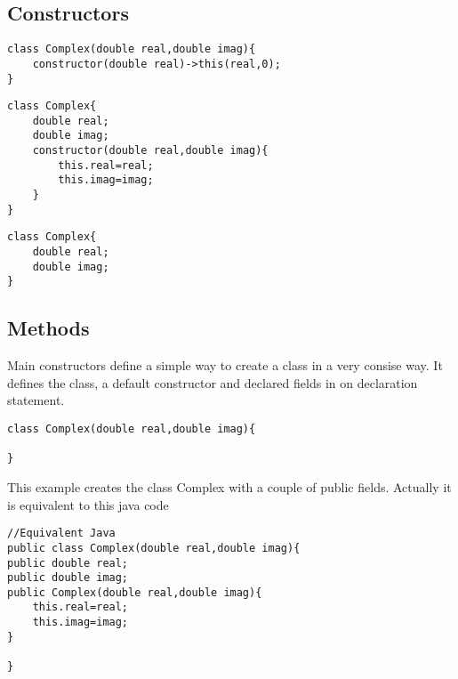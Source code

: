 \documentclass{tufte-book}
\begin{document}
            \subsection{Constructors}

            \begin{lstlisting}
class Complex(double real,double imag){
    constructor(double real)->this(real,0);
}
            \end{lstlisting}

            \begin{lstlisting}
class Complex{
    double real;
    double imag;
    constructor(double real,double imag){
        this.real=real;
        this.imag=imag;
    }
}    
            \end{lstlisting}

            \begin{lstlisting}
class Complex{
    double real;
    double imag;
}
            \end{lstlisting}





            \subsection{Methods}


            Main constructors define a simple way to create a class in a very consise way. It defines the class, a default  constructor and  declared fields in on declaration statement.
            \begin{lstlisting}
class Complex(double real,double imag){

}
            \end{lstlisting}

            This example creates the class Complex with a couple of public fields. Actually it is equivalent to this java code

            \begin{lstlisting}
//Equivalent Java
public class Complex(double real,double imag){
public double real;
public double imag;
public Complex(double real,double imag){
    this.real=real;
    this.imag=imag;
}

}
            \end{lstlisting}
\end{document}
